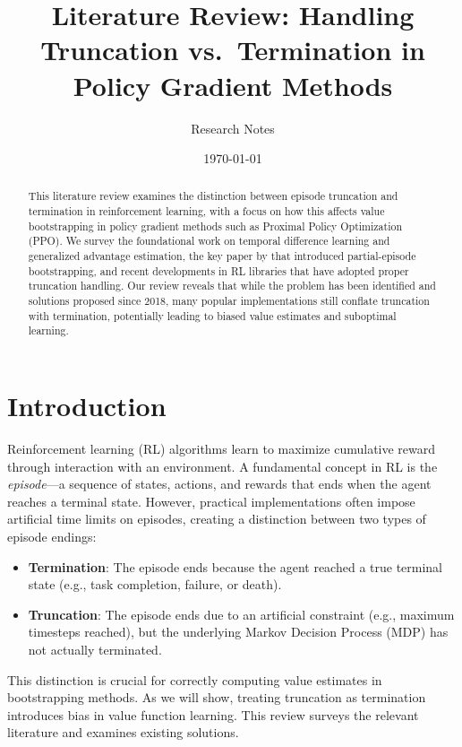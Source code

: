 \documentclass[11pt,a4paper]{article}
\title{Literature Review: Handling Truncation vs.\ Termination in Policy Gradient Methods}
\author{Research Notes}
\date{\today}
\begin{document}
\maketitle

\begin{abstract}
This literature review examines the distinction between episode truncation and termination in reinforcement learning, with a focus on how this affects value bootstrapping in policy gradient methods such as Proximal Policy Optimization (PPO). We survey the foundational work on temporal difference learning and generalized advantage estimation, the key paper by \citet{pardo2018time} that introduced partial-episode bootstrapping, and recent developments in RL libraries that have adopted proper truncation handling. Our review reveals that while the problem has been identified and solutions proposed since 2018, many popular implementations still conflate truncation with termination, potentially leading to biased value estimates and suboptimal learning.
\end{abstract}

\section{Introduction}

Reinforcement learning (RL) algorithms learn to maximize cumulative reward through interaction with an environment. A fundamental concept in RL is the \emph{episode}---a sequence of states, actions, and rewards that ends when the agent reaches a terminal state. However, practical implementations often impose artificial time limits on episodes, creating a distinction between two types of episode endings:

\begin{itemize}
    \item \textbf{Termination}: The episode ends because the agent reached a true terminal state (e.g., task completion, failure, or death).
    \item \textbf{Truncation}: The episode ends due to an artificial constraint (e.g., maximum timesteps reached), but the underlying Markov Decision Process (MDP) has not actually terminated.
\end{itemize}

This distinction is crucial for correctly computing value estimates in bootstrapping methods. As we will show, treating truncation as termination introduces bias in value function learning. This review surveys the relevant literature and examines existing solutions.
\end{document}
